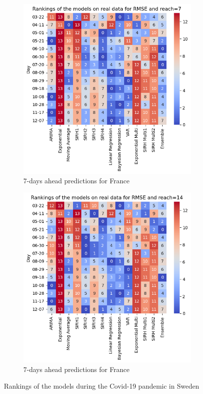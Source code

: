 \begin{figure}[h!]
  \begin{subfigure}[b]{0.45\textwidth}
      \centering
      \includegraphics[width=\textwidth]{figures/heatmap_test_france_7.png} 
      \caption{7-days ahead predictions for France}
      \label{fig:sousfig1gh}
  \end{subfigure}
  \hfill
  \begin{subfigure}[b]{0.45\textwidth}
      \centering
      \includegraphics[width=\textwidth]{figures/heatmap_test_france_14.png} 
      \caption{7-days ahead predictions for France}
      \label{fig:sousfig2gh}
  \end{subfigure}
  \hfill
  \caption{Rankings of the models during the Covid-19 pandemic in Sweden}
  \label{fig:rankings_real_data}
\end{figure}


